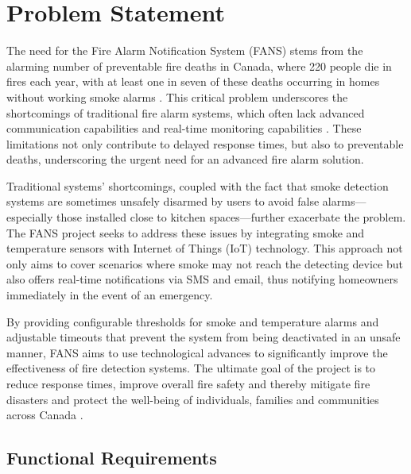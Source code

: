 \section{Problem Statement}

The need for the Fire Alarm Notification System (FANS) stems from the alarming number of preventable fire deaths in
Canada, where 220 people die in fires each year, with at least one in seven of these deaths occurring in homes without
working smoke alarms \cite{fire-stats}. This critical problem underscores the shortcomings of traditional fire alarm
systems, which often lack advanced communication capabilities and real-time monitoring capabilities
\cite{modern-fire-alarms}. These limitations not only contribute to delayed response times, but also to preventable
deaths, underscoring the urgent need for an advanced fire alarm solution.

Traditional systems' shortcomings, coupled with the fact that smoke detection systems are sometimes unsafely disarmed
by users to avoid false alarms—especially those installed close to kitchen spaces—further exacerbate the problem. The
FANS project seeks to address these issues by integrating smoke and temperature sensors with Internet of Things (IoT)
technology. This approach not only aims to cover scenarios where smoke may not reach the detecting device but also
offers real-time notifications via SMS and email, thus notifying homeowners immediately in the event of an emergency.

By providing configurable thresholds for smoke and temperature alarms and adjustable timeouts that prevent the system
from being deactivated in an unsafe manner, FANS aims to use technological advances to significantly improve the
effectiveness of fire detection systems. The ultimate goal of the project is to reduce response times, improve overall
fire safety and thereby mitigate fire disasters and protect the well-being of individuals, families and communities
across Canada \cite{smoke-alarm-gc}.

\subsection{Functional Requirements}

